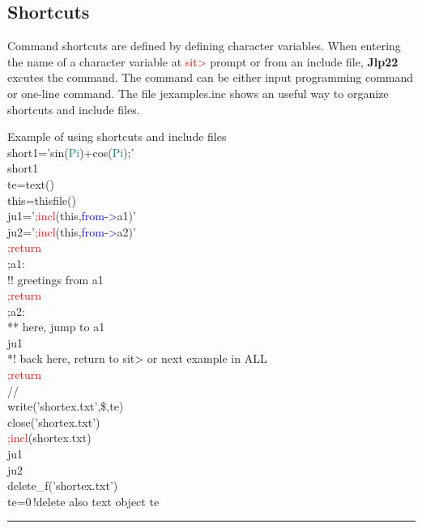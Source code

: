 \subsection{Shortcuts} 
\label{short} 
Command shortcuts are defined by defining character variables. When entering the 
name of a character variable at \textcolor{Red}{sit>} prompt or from an include file, \textbf{Jlp22} excutes the command. 
The command can be either input programming command or one-line command. The file jexamples.inc 
shows an useful way to organize shortcuts and include files. 
\singlespacing 
\begin{example}[shortex]Example of using shortcuts and include files\\ 
\label{shortex} 
\noindent short1='\textcolor{VioletRed}{sin}(\textcolor{teal}{Pi})+\textcolor{VioletRed}{cos}(\textcolor{teal}{Pi});'\\ 
short1\\ 
te=\textcolor{VioletRed}{text}()\\ 
this=\textcolor{VioletRed}{thisfile}()\\ 
ju1='\textcolor{Red}{;incl}(this,\textcolor{blue}{from->}a1)'\\ 
ju2='\textcolor{Red}{;incl}(this,\textcolor{blue}{from->}a2)'\\ 
\textcolor{Red}{;return}\\ 
;a1:\\ 
{\color{ForestGreen}!! greetings from a1}\\ 
\textcolor{Red}{;return}\\ 
;a2:\\ 
{\color{ForestGreen}** here, jump to a1}\\ 
ju1\\ 
{\color{ForestGreen}*! back here, return to sit> or next example in ALL}\\ 
\textcolor{Red}{;return}\\ 
//                      \\ 
\textcolor{VioletRed}{write}('shortex.txt',\$,te)\\ 
\textcolor{VioletRed}{close}('shortex.txt')\\ 
\textcolor{Red}{;incl}(shortex.txt)\\ 
ju1\\ 
ju2\\ 
\textcolor{VioletRed}{delete\_f}('shortex.txt')\\ 
te=0\,{\color{ForestGreen}!delete also text object te}\\ 
\end{example} 
\vspace{-7mm} \rule{5cm}{0.1pt} 
\onehalfspacing 
